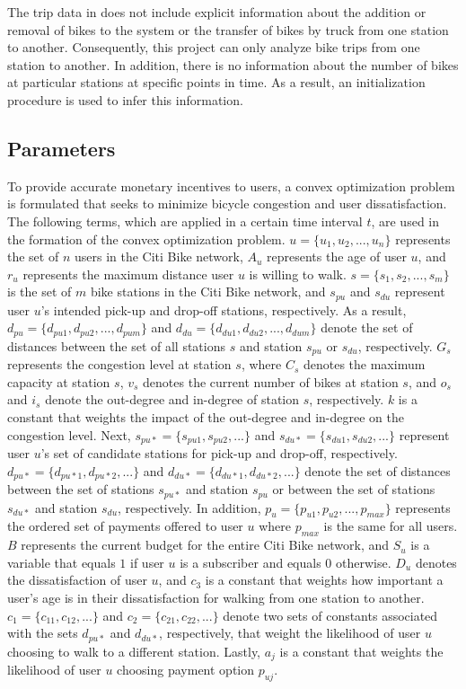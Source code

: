 \documentclass[times, 10pt,twocolumn]{article}
\begin{document}
The trip data in \cite{dataset} does not include explicit information about the addition or removal of bikes to the system or the transfer of bikes by truck from one station to another. Consequently, this project can only analyze bike trips from one station to another. In addition, there is no information about the number of bikes at particular stations at specific points in time. As a result, an initialization procedure is used to infer this information. 

\subsection{Parameters}

To provide accurate monetary incentives to users, a convex optimization problem is formulated that seeks to minimize bicycle congestion and user dissatisfaction. The following terms, which are applied in a certain time interval $t$, are used in the formation of the convex optimization problem. $u = \{u_1, u_2, ..., u_n\}$ represents the set of $n$ users in the Citi Bike network, $A_u$ represents the age of user $u$, and $r_u$ represents the maximum distance user $u$ is willing to walk. $s = \{s_1, s_2, ..., s_m\}$ is the set of $m$ bike stations in the Citi Bike network, and $s_{pu}$ and $s_{du}$ represent user $u$'s intended pick-up and drop-off stations, respectively. As a result, $d_{pu} = \{d_{pu1}, d_{pu2}, ..., d_{pum}\}$ and $d_{du} = \{d_{du1}, d_{du2}, ..., d_{dum}\}$ denote the set of distances between the set of all stations $s$ and station $s_{pu}$ or $s_{du}$, respectively. $G_s$ represents the congestion level at station $s$, where $C_s$ denotes the maximum capacity at station $s$, $v_s$ denotes the current number of bikes at station $s$, and $o_s$ and $i_s$ denote the out-degree and in-degree of station $s$, respectively. $k$ is a constant that weights the impact of the out-degree and in-degree on the congestion level. Next, $s_{pu*} = \{s_{pu1}, s_{pu2}, ...\}$ and $s_{du*} = \{s_{du1}, s_{du2}, ...\}$ represent user $u$'s set of candidate stations for pick-up and drop-off, respectively. $d_{pu*} = \{d_{pu*1}, d_{pu*2}, ...\}$ and $d_{du*} = \{d_{du*1}, d_{du*2}, ...\}$ denote the set of distances between the set of stations $s_{pu*}$ and station $s_{pu}$ or between the set of stations $s_{du*}$ and station $s_{du}$, respectively. In addition, $p_u = \{p_{u1}, p_{u2}, ..., p_{max}\}$ represents the ordered set of payments offered to user $u$ where $p_{max}$ is the same for all users. $B$ represents the current budget for the entire Citi Bike network, and $S_u$ is a variable that equals $1$ if user $u$ is a subscriber and equals $0$ otherwise. $D_u$ denotes the dissatisfaction of user $u$, and $c_3$ is a constant that weights how important a user's age is in their dissatisfaction for walking from one station to another. $c_1 = \{c_{11}, c_{12}, ...\}$ and $c_2 = \{c_{21}, c_{22}, ...\}$ denote two sets of constants associated with the sets $d_{pu*}$ and $d_{du*}$, respectively, that weight the likelihood of user $u$ choosing to walk to a different station. Lastly, $a_j$ is a constant that weights the likelihood of user $u$ choosing payment option $p_{uj}$.
\end{document}
